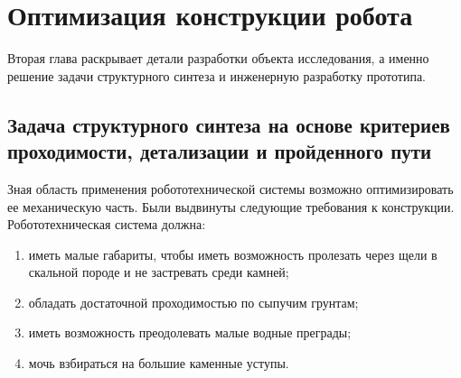 \chapter{Оптимизация конструкции робота}\label{ch:ch2}

Вторая глава раскрывает детали разработки объекта исследования, а именно решение задачи структурного синтеза и инженерную разработку прототипа.

\section{Задача структурного синтеза на основе критериев проходимости, детализации и пройденного пути}

Зная область применения робототехнической системы возможно оптимизировать ее механическую часть. Были выдвинуты следующие требования к конструкции. Робототехническая система должна:
\begin{enumerate}
    \item иметь малые габариты, чтобы иметь возможность пролезать через щели в скальной породе и не застревать среди камней;
    \item обладать достаточной проходимостью по сыпучим грунтам;
    \item иметь возможность преодолевать малые водные преграды;
    \item мочь взбираться на большие каменные уступы.
\end{enumerate}

